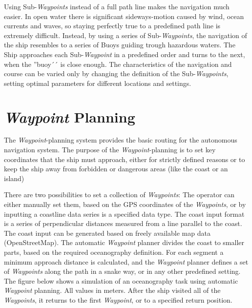 Using Sub-\emph{Waypoints} instead of a full path line makes the navigation much easier. In open water there is significant sideways-motion caused by wind, ocean currents and waves, so staying perfectly true to a predefined path line is extremely difficult.
Instead, by using a series of Sub-\emph{Waypoints}, the navigation of the ship resembles to a series of Buoys guiding trough hazardous waters. The Ship approaches each Sub-\emph{Waypoint} in a predefined order and turns to the next, when the ''buoy´´ is close enough.
The characteristics of the navigation and course can be varied only by changing the definition of the Sub-\emph{Waypoints}, setting optimal parameters for different locations and settings.

\section{\emph{Waypoint} Planning}

The \emph{Waypoint}-planning system provides the basic routing for the autonomous navigation system.
The purpose of the \emph{Waypoint}-planning is to set key coordinates that the ship must approach, either for strictly defined reasons or to keep the ship away from forbidden or dangerous areas (like the coast or an island)

There are two possibilities to set a collection of \emph{Waypoints}: The operator can either manually set them, based on the GPS coordinates of the \emph{Waypoints}, or by inputting a coastline data series is a specified data type. The coast input format is a series of perpendicular distances measured from a line parallel to the coast. The coast input can be generated based on freely available map data (OpenStreetMap).
The automatic \emph{Waypoint} planner divides the coast to smaller parts, based on the required oceanography definition. For each segment a minimum approach distance is calculated, and the \emph{Waypoint} planner defines a set of \emph{Waypoints} along the path in a snake way, or in any other predefined setting. The figure below shows a simulation of an oceanography task using automatic \emph{Waypoint} planning. All values in meters.
After the ship visited all of the \emph{Waypoints}, it returns to the first \emph{Waypoint}, or to a specified return position.

